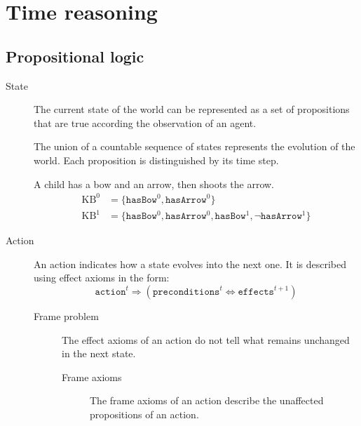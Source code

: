 \chapter{Time reasoning}


\section{Propositional logic}

\begin{description}
    \item[State]  
        The current state of the world can be represented as a set of propositions that are true according the observation of an agent.

        The union of a countable sequence of states represents the evolution of the world. Each proposition is distinguished by its time step.

        \begin{example}
            A child has a bow and an arrow, then shoots the arrow.
            \[
                \begin{split}
                    \text{KB}^0 &= \{ \texttt{hasBow}^0, \texttt{hasArrow}^0  \} \\
                    \text{KB}^1 &= \{ \texttt{hasBow}^0, \texttt{hasArrow}^0, \texttt{hasBow}^1, \lnot\texttt{hasArrow}^1  \} 
                \end{split}
            \]
        \end{example}

    \item[Action] 
        An action indicates how a state evolves into the next one.
        It is described using effect axioms in the form:
        \[ \texttt{action}^t \Rightarrow (\texttt{preconditions}^t \iff \texttt{effects}^{t+1}) \]

        \begin{description}
            \item[Frame problem] 
                The effect axioms of an action do not tell what remains unchanged in the next state.

            \begin{description}
                \item[Frame axioms] 
                    The frame axioms of an action describe the unaffected propositions of an action.
            \end{description}
        \end{description}


\end{description}
